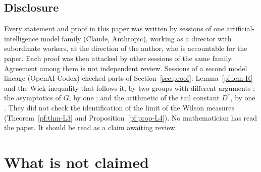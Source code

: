 \subsection*{Disclosure}
Every statement and proof in this paper was written by sessions of one artificial-intelligence model family (Claude, Anthropic), working as a director with subordinate workers, at the direction of the author, who is accountable for the paper. Each proof was then attacked by other sessions of the same family. Agreement among them is not independent review. Sessions of a second model lineage (OpenAI Codex) checked parts of Section~\ref{sec:proof}: Lemma~\ref{pf:lem-R} and the Wick inequality that follows it, by two groups with different arguments \cite[comments 7102490558, 7102590992]{RepoThread}; the asymptotics of $G$, by one \cite[comment 7102490558]{RepoThread}; and the arithmetic of the tail constant $D^*$, by one \cite[comment 7102590992]{RepoThread}. They did not check the identification of the limit of the Wilson measures (Theorem~\ref{pf:thm-L3} and Proposition~\ref{pf:prop-L4}). No mathematician has read the paper. It should be read as a claim awaiting review.

\tableofcontents

\section{What is not claimed}\label{sec:notclaimed}

